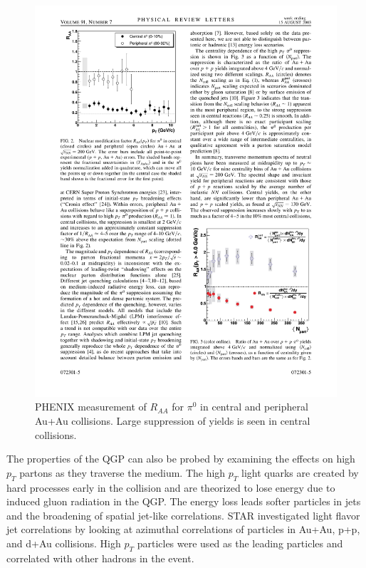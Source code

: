 \begin{figure}[htbp]
\begin{center}
\includegraphics[scale=1.2]{Plots/Intro/pi_RAA.pdf}
\end{center}
\caption[$R_{AA}$ for $\pi^0$]{PHENIX measurement of $R_{AA}$ for $\pi^0$ in central and peripheral Au+Au collisions. Large suppression of yields is seen in central collisions.}
\label{fig:piRAA}
\end{figure}

The properties of the QGP can also be probed by examining the effects on high $p_T$ partons as they traverse the medium. The high $p_T$ light quarks are created by hard processes early in the collision and are theorized to lose energy due to induced gluon radiation in the QGP. The energy loss leads softer particles in jets and the broadening of spatial jet-like correlations. STAR investigated light flavor jet correlations by looking at azimuthal correlations of particles in Au+Au, p+p, and d+Au collisions. High $p_T$ particles were used as the leading particles and correlated with other hadrons in the event.


